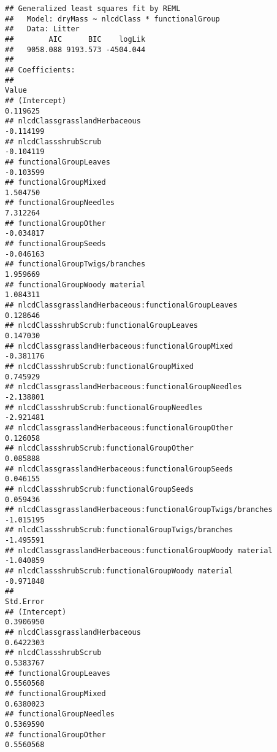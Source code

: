 \documentclass[]{article}
\begin{document}
\begin{verbatim}
## Generalized least squares fit by REML
##   Model: dryMass ~ nlcdClass * functionalGroup 
##   Data: Litter 
##        AIC      BIC    logLik
##   9058.088 9193.573 -4504.044
## 
## Coefficients:
##                                                                Value
## (Intercept)                                                 0.119625
## nlcdClassgrasslandHerbaceous                               -0.114199
## nlcdClassshrubScrub                                        -0.104119
## functionalGroupLeaves                                      -0.103599
## functionalGroupMixed                                        1.504750
## functionalGroupNeedles                                      7.312264
## functionalGroupOther                                       -0.034817
## functionalGroupSeeds                                       -0.046163
## functionalGroupTwigs/branches                               1.959669
## functionalGroupWoody material                               1.084311
## nlcdClassgrasslandHerbaceous:functionalGroupLeaves          0.128646
## nlcdClassshrubScrub:functionalGroupLeaves                   0.147030
## nlcdClassgrasslandHerbaceous:functionalGroupMixed          -0.381176
## nlcdClassshrubScrub:functionalGroupMixed                    0.745929
## nlcdClassgrasslandHerbaceous:functionalGroupNeedles        -2.138801
## nlcdClassshrubScrub:functionalGroupNeedles                 -2.921481
## nlcdClassgrasslandHerbaceous:functionalGroupOther           0.126058
## nlcdClassshrubScrub:functionalGroupOther                    0.085888
## nlcdClassgrasslandHerbaceous:functionalGroupSeeds           0.046155
## nlcdClassshrubScrub:functionalGroupSeeds                    0.059436
## nlcdClassgrasslandHerbaceous:functionalGroupTwigs/branches -1.015195
## nlcdClassshrubScrub:functionalGroupTwigs/branches          -1.495591
## nlcdClassgrasslandHerbaceous:functionalGroupWoody material -1.040859
## nlcdClassshrubScrub:functionalGroupWoody material          -0.971848
##                                                            Std.Error
## (Intercept)                                                0.3906950
## nlcdClassgrasslandHerbaceous                               0.6422303
## nlcdClassshrubScrub                                        0.5383767
## functionalGroupLeaves                                      0.5560568
## functionalGroupMixed                                       0.6380023
## functionalGroupNeedles                                     0.5369590
## functionalGroupOther                                       0.5560568

\end{verbatim}
\end{document}
